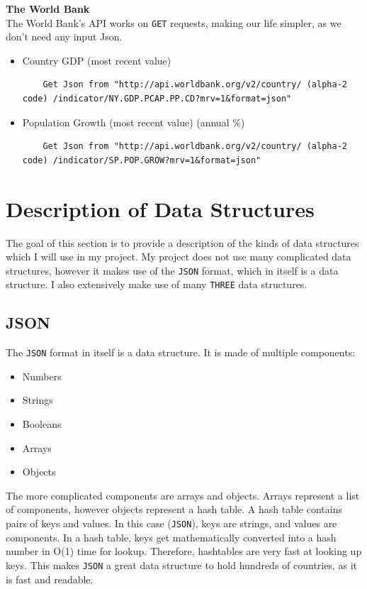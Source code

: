 \textbf{The World Bank} \\
The World Bank's API works on \verb|GET| requests, making our life simpler, as we don't need any input Json.
\begin{itemize}
    \item Country GDP (most recent value)
    \begin{lstlisting}
    Get Json from "http://api.worldbank.org/v2/country/ (alpha-2 code) /indicator/NY.GDP.PCAP.PP.CD?mrv=1&format=json"
    \end{lstlisting}

    \item Population Growth (most recent value) (annual \%)
    \begin{lstlisting}
    Get Json from "http://api.worldbank.org/v2/country/ (alpha-2 code) /indicator/SP.POP.GROW?mrv=1&format=json"
    \end{lstlisting}
\end{itemize}

\newpage

\section{Description of Data Structures}
The goal of this section is to provide a description of the kinds of data structures which I will use in my project. My project does not use many complicated data structures, however it makes use of the \verb|JSON| format, which in itself is a data structure. I also extensively make use of many \verb|THREE| data structures.

\subsection{JSON}
The \verb|JSON| format in itself is a data structure. It is made of multiple components:
\begin{itemize}
    \item Numbers
    \item Strings
    \item Booleans
    \item Arrays
    \item Objects
\end{itemize}
The more complicated components are arrays and objects. Arrays represent a list of components, however objects represent a hash table. A hash table contains pairs of keys and values. In this case (\verb|JSON|), keys are strings, and values are components. In a hash table, keys get mathematically converted into a hash number in O(1) time for lookup. Therefore, hashtables are very fast at looking up keys. This makes \verb|JSON| a great data structure to hold hundreds of countries, as it is fast and readable.

